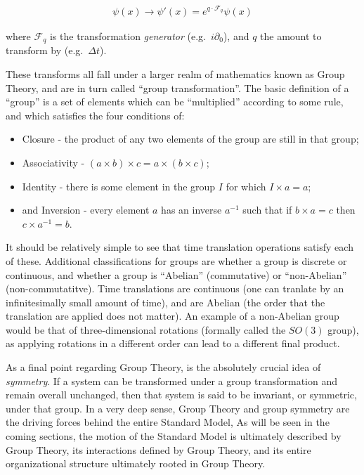     \begin{equation} \begin{split}
        \psi(x) \rightarrow \psi'(x) = e^{ q \cdot \mathcal{F}_q } \psi(x)
    \end{split} \end{equation}

    where $\mathcal{F}_q$ is the transformation \textit{generator} (e.g.\ $i\partial_0$),
        and $q$ the amount to transform by (e.g.\ $\Delta t$).

    These transforms all fall under a larger realm of mathematics known as Group Theory,
        and are in turn called ``group transformation''.
    The basic definition of a ``group'' is a set of elements which can be ``multiplied'' according to some rule,
        and which satisfies the four conditions of\cite{Cheng_book}:
    \begin{itemize}
        \item Closure - the product of any two elements of the group are still in that group;
        \item Associativity - $(a \times b)\times c = a\times(b \times c)$;
        \item Identity - there is some element in the group $I$ for which $I \times a=a$;
        \item and Inversion - every element $a$ has an inverse $a^{-1}$ such that if $b \times a = c$ then $c \times a^{-1} = b$.
    \end{itemize}

    It should be relatively simple to see that time translation operations satisfy each of these.
    Additional classifications for groups are whether a group is discrete or continuous,
        and whether a group is ``Abelian'' (commutative) or ``non-Abelian'' (non-commutatitve).
    Time translations are continuous (one can tranlate by an infinitesimally small amount of time),
        and are Abelian (the order that the translation are applied does not matter).
    An example of a non-Abelian group would be that of three-dimensional rotations (formally called the $SO(3)$ group),
        as applying rotations in a different order can lead to a different final product.

    As a final point regarding Group Theory, is the absolutely crucial idea of \textit{symmetry}.
    If a system can be transformed under a group transformation and remain overall unchanged,
        then that system is said to be invariant, or symmetric, under that group.
    In a very deep sense, Group Theory and group symmetry are the driving forces behind the entire Standard Model,
    As will be seen in the coming sections,
        the motion of the Standard Model is ultimately described by Group Theory,
        its interactions defined by Group Theory,
        and its entire organizational structure ultimately rooted in Group Theory.

